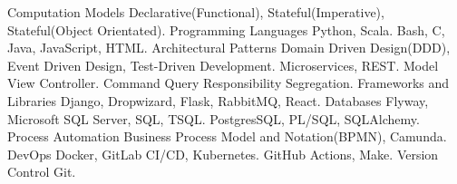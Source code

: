 \begin{cvskills}
  \cvskill
    {Computation Models} %
    { Declarative(Functional), Stateful(Imperative), Stateful(Object Orientated).}
  \cvskill
    {Programming Languages} %
    {  Python, Scala. }
  \cvskill
    {} %
    {  Bash, C, Java, JavaScript, HTML.}
  \cvskill
    {Architectural Patterns} %
    {  Domain Driven Design(DDD), Event Driven Design, Test-Driven Development.}
  \cvskill
    {} %
    {  Microservices, REST.}
  \cvskill
    {} %
    {  Model View Controller.}
  \cvskill
    {} %
    {  Command Query Responsibility Segregation.}
  \cvskill
    {Frameworks and Libraries} %
    {  Django, Dropwizard, Flask, RabbitMQ, React.}
  \cvskill
  {Databases} %
  {  Flyway, Microsoft SQL Server, SQL, TSQL.}
  \cvskill
  {} %
  {  PostgresSQL, PL/SQL, SQLAlchemy.}
  \cvskill
    {Process Automation}
    { Business Process Model and Notation(BPMN), Camunda.}
  \cvskill
    {DevOps} %
    { Docker, GitLab CI/CD, Kubernetes.} %
  \cvskill
    {} %
    {  GitHub Actions, Make.}
  \cvskill
  {Version Control} %
  { Git.} %
\end{cvskills}
